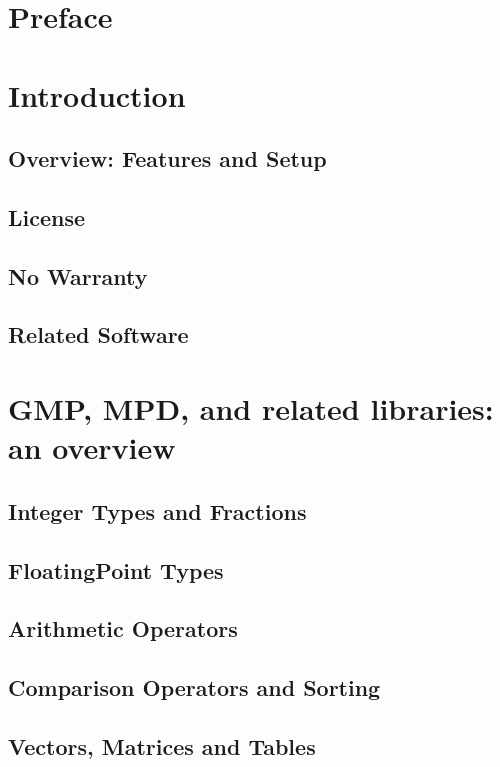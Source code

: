 \documentclass[12pt,a4paper,openany]{book}
\begin{document}
\chapter{Preface}

\chapter{Introduction}

\section{Overview: Features and Setup}

\section{License}

\section{No Warranty}

\section{Related Software}

\chapter{GMP, MPD, and related libraries: an overview}

\section{Integer Types and Fractions}

\section{FloatingPoint Types}

\section{Arithmetic Operators}

\section{Comparison Operators and Sorting}

\section{Vectors, Matrices and Tables}
\end{document}
